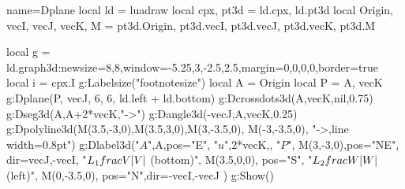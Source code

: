 \begin{luadraw}{name=Dplane}
local ld = luadraw
local cpx, pt3d = ld.cpx, ld.pt3d
local Origin, vecI, vecJ, vecK, M = pt3d.Origin, pt3d.vecI, pt3d.vecJ, pt3d.vecK, pt3d.M

local g = ld.graph3d:new{size={8,8},window={-5.25,3,-2.5,2.5},margin={0,0,0,0},border=true}
local i = cpx.I
g:Labelsize("footnotesize")
local A = Origin
local P = {A, vecK}
g:Dplane(P, vecJ, 6, 6, ld.left + ld.bottom)
g:Dcrossdots3d({A,vecK},nil,0.75)
g:Dseg3d({A,A+2*vecK},"->")
g:Dangle3d(-vecJ,A,vecK,0.25)
g:Dpolyline3d({{M(3.5,-3,0),M(3.5,3,0)},{M(3,-3.5,0), M(-3,-3.5,0)}}, "->,line width=0.8pt")
g:Dlabel3d("$A$",A,{pos="E"},
    "$u$",2*vecK,{},
    "$P$", M(3,-3,0),{pos="NE", dir={vecJ,-vecI}},
    "$L_1\\frac{V}{\\|V\\|}$ (bottom)", M(3.5,0,0), {pos="S"},
    "$L_2\\frac{W}{\\|W\\|}$ (left)", M(0,-3.5,0), {pos="N",dir={-vecI,-vecJ}}
)
g:Show()
\end{luadraw}

